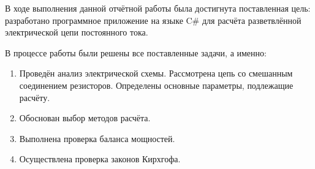 В ходе выполнения данной отчётной работы была достигнута поставленная цель: разработано программное приложение на языке C\# для расчёта разветвлённой электрической цепи постоянного тока.

В процессе работы были решены все поставленные задачи, а именно:
\begin{enumerate}
    \item Проведён анализ электрической схемы. Рассмотрена цепь со смешанным соединением резисторов. Определены основные параметры, подлежащие расчёту.
    \item Обоснован выбор методов расчёта.
    \item Выполнена проверка баланса мощностей.
    \item Осуществлена проверка законов Кирхгофа.
\end{enumerate}
